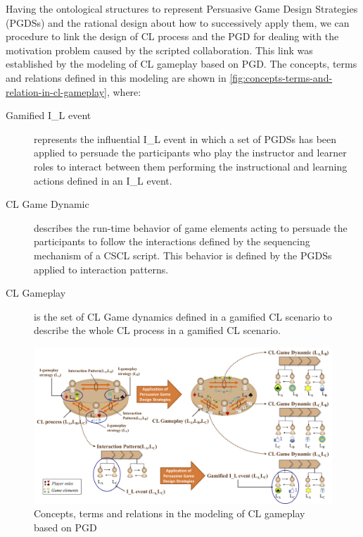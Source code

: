 Having the ontological structures to represent Persuasive Game Design Strategies (PGDSs) and the rational design about how to successively apply them, we can procedure to link the design of CL process and the PGD for dealing with the motivation problem caused by the scripted collaboration. This link was established by the modeling of CL gameplay based on PGD. The concepts, terms and relations defined in this modeling are shown in \autoref{fig:concepts-terms-and-relation-in-cl-gameplay}, where:

\begin{description}
\item[Gamified I\_L event]
represents the influential I\_L event in which a set of PGDSs has been applied to persuade the participants who play the instructor and learner roles to interact between them performing the instructional and learning actions defined in an I\_L event.

\item[CL Game Dynamic]
describes the run-time behavior of game elements acting to persuade the participants to follow the interactions defined by the sequencing mechanism of a CSCL script. This behavior is defined by the PGDSs applied to interaction patterns.
 
\item[CL Gameplay]
is the set of CL Game dynamics defined in a gamified CL scenario to describe the whole CL process in a gamified CL scenario.
\end{description}


\begin{figure}[!htbp]
 \caption{Concepts, terms and relations in the modeling of CL gameplay based on PGD}
 \label{fig:concepts-terms-and-relation-in-cl-gameplay}
 \centering
 \includegraphics[width=1\textwidth]{images/chap-ontogacles2/concepts-terms-and-relation-in-cl-gameplay.png}
 \fautor
\end{figure}

